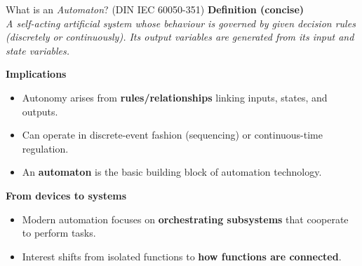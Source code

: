 \begin{frame}{What is an \textit{Automaton}? (DIN IEC 60050-351)}
\textbf{Definition (concise)}\\
\emph{A self-acting artificial system whose behaviour is governed by given decision rules (discretely or continuously). Its output variables are generated from its input and state variables.}

\vspace{2mm}
\textbf{Implications}
\begin{itemize}
  \item Autonomy arises from \textbf{rules/relationships} linking inputs, states, and outputs.
  \item Can operate in discrete-event fashion (sequencing) or continuous-time regulation.
  \item An \textbf{automaton} is the basic building block of automation technology.
\end{itemize}

\vspace{1mm}
\textbf{From devices to systems}
\begin{itemize}
  \item Modern automation focuses on \textbf{orchestrating subsystems} that cooperate to perform tasks.
  \item Interest shifts from isolated functions to \textbf{how functions are connected}.
\end{itemize}
\end{frame}

